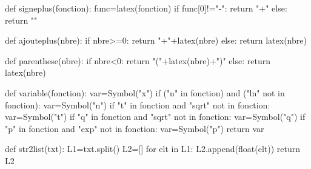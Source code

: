 \begin{pycode}
def signeplus(fonction):
    func=latex(fonction)
    if func[0]!="-":
        return "+"
    else:
        return ""

def ajouteplus(nbre):
    if nbre>=0:
        return "+"+latex(nbre)
    else:
        return latex(nbre)
        
def parenthese(nbre):
    if nbre<0:
        return "("+latex(nbre)+")"
    else:
        return latex(nbre)

def variable(fonction):
    var=Symbol("x")
    if ("n" in fonction) and ("ln" not in fonction):
        var=Symbol("n")
    if "t" in fonction and "sqrt" not in fonction:
        var=Symbol("t")
    if "q" in fonction and "sqrt" not in fonction:
        var=Symbol("q")
    if "p" in fonction and "exp" not in fonction:
        var=Symbol("p")
    return var

def str2list(txt):
    L1=txt.split()
    L2=[]
    for elt in L1:
        L2.append(float(elt))
    return L2


\end{pycode}
